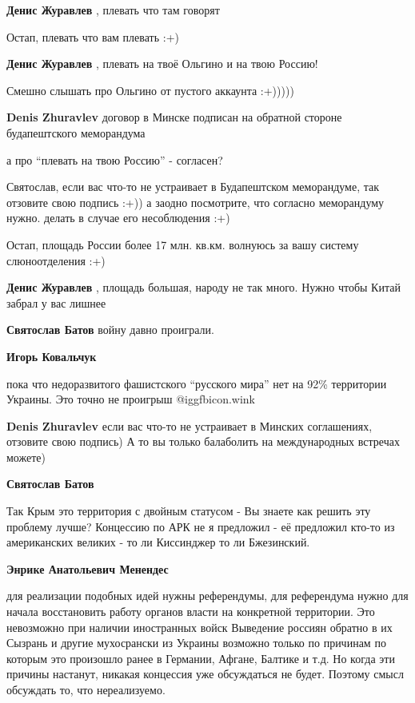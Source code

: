 \begin{itemize}
\begin{itemize}
\textbf{Денис Журавлев} , плевать что там говорят

Остап, плевать что вам плевать :+)

\textbf{Денис Журавлев} , плевать на твоё Ольгино и на твою Россию!

Смешно слышать про Ольгино от пустого аккаунта :+)))))


\textbf{Denis Zhuravlev} договор в Минске подписан на обратной стороне будапештского меморандума

а про \enquote{плевать на твою Россию} - согласен?


Святослав, если вас что-то не устраивает в Будапештском меморандуме, так
отзовите свою подпись :+)) а заодно посмотрите, что согласно меморандуму нужно.
делать в случае его несоблюдения :+)

Остап, площадь России более 17 млн. кв.км. волнуюсь за вашу систему слюноотделения :+)

\textbf{Денис Журавлев} , площадь большая, народу не так много. Нужно чтобы Китай забрал у вас лишнее

\textbf{Святослав Батов} войну давно проиграли.


\textbf{Игорь Ковальчук} 

пока что недоразвитого фашистского \enquote{русского мира} нет на 92\% территории
Украины. Это точно не проигрыш  @igg{fbicon.wink} 


\textbf{Denis Zhuravlev} если вас что-то не устраивает в Минских соглашениях, отзовите свою подпись)
А то вы только балаболить на международных встречах можете)

\textbf{Святослав Батов} 

Так Крым это территория с двойным статусом - Вы знаете как решить эту проблему
лучше? Концессию по АРК не я предложил - её предложил кто-то из американских
великих - то ли Киссинджер то ли Бжезинский.


\textbf{Энрике Анатольевич Менендес} 

для реализации подобных идей нужны референдумы, для референдума нужно для
начала восстановить работу органов власти на конкретной территории. Это
невозможно при наличии иностранных войск Выведение россиян обратно в их Сызрань
и другие мухосрански из Украины возможно только по причинам по которым это
произошло ранее в Германии, Афгане, Балтике и т.д. Но когда эти причины
настанут, никакая концессия уже обсуждаться не будет. Поэтому смысл обсуждать
то, что нереализуемо.



\end{itemize}
\end{itemize}
